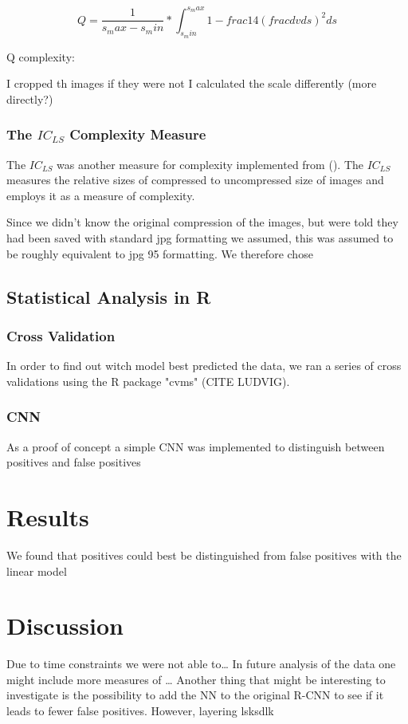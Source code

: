 \documentclass[12pt]{article}
\begin{document}
\begin{equation}
	Q = \frac{1}{s_max-s_min}*\int_{s_min}^{s_max} 1-frac{1}{4} (frac{dv}{ds})^2 ds
	\label{eq:Q5}
\end{equation} 


Q complexity:

I cropped th images if they were not %
I calculated the scale differently (more directly?)

\subsubsection{The $IC_{LS}$ Complexity Measure}

The $IC_{LS}$ was another measure for complexity implemented from (\cite{yuImageComplexitySpatial2013}). The $IC_{LS}$ measures the relative sizes of compressed to uncompressed size of images and employs it as a measure of complexity.

Since we didn't know the original compression of the images, but were told they had been saved with standard jpg formatting we assumed, this was assumed to be roughly equivalent to jpg 95 formatting. We therefore chose 

\subsection{Statistical Analysis in R}

\subsubsection{Cross Validation}
In order to find out witch model best predicted the data, we ran a series of cross validations using the R package "cvms" (CITE LUDVIG).


\subsubsection{CNN}
As a proof of concept a simple CNN was implemented to distinguish between positives and false positives


\section{Results}
We found that positives could best be distinguished from false positives with the linear model 


\section{Discussion}

Due to time constraints we were not able to\dots
In future analysis of the data one might include more measures of \dots
Another thing that might be interesting to investigate is the possibility to add the NN to the original R-CNN to see if it leads to fewer false positives. However, layering lsksdlk




\clearpage
\appto{\bibsetup}{\raggedright}
\printbibliography
\end{document}

